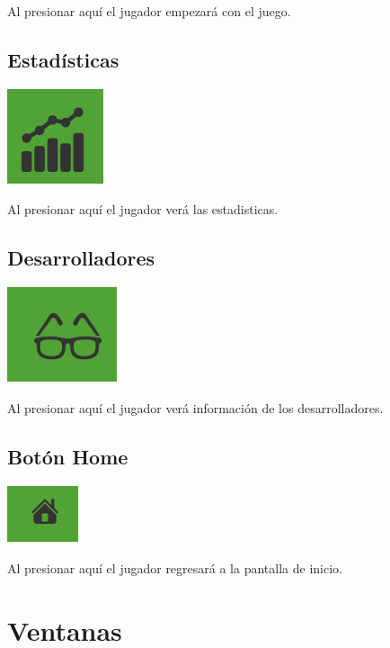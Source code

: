 \documentclass[a4paper,11pt]{article}
\begin{document}
Al presionar aquí el jugador empezará con el juego.
\subsection{Estadísticas}
\includegraphics{estadistICO.png}

Al presionar aquí el jugador verá las estadisticas.

\subsection{Desarrolladores}
\includegraphics{develoICO.png}

Al presionar aquí el jugador verá información de los desarrolladores.


\subsection{Botón Home}
\includegraphics{home.png}

Al presionar aquí el jugador regresará a la pantalla de inicio.

\section{Ventanas}
\end{document}
